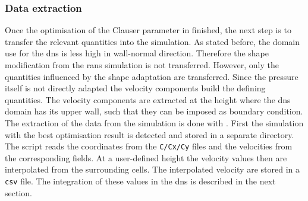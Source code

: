 

\subsubsection{Data extraction} \label{subsec:data_extr}

Once the optimisation of the Clauser parameter in  finished, the next step is to transfer the relevant quantities into the  simulation.
As stated before, the domain use for the \acrshort{dns} is less high in wall-normal direction. 
Therefore the shape modification from the \acrshort{rans} simulation is not transferred.
However, only the quantities influenced by the shape adaptation are transferred.
Since the pressure itself is not directly adapted the velocity components build the defining quantities.
The velocity components are extracted at the height where the \acrshort{dns} domain has its upper wall, such that they can be imposed as boundary condition.
The extraction of the data from the  simulation is done with .
First the simulation with the best optimisation result is detected and stored in a separate directory.
The  script reads the coordinates from the \texttt{C/Cx/Cy} files and the velocities from the corresponding fields. 
At a user-defined height the velocity values then are interpolated from the surrounding cells. 
The interpolated velocity are stored in a \texttt{csv} file. 
The integration of these values in the \acrshort{dns} is described in the next section.


